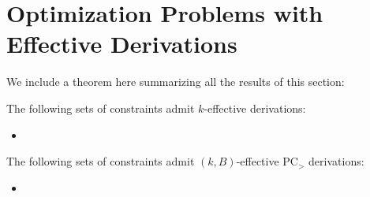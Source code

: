 \section{Optimization Problems with Effective Derivations}
We include a theorem here summarizing all the results of this section:
\begin{corollary}\label{cor:effective_list}
The following sets of constraints admit $k$-effective derivations:
\begin{itemize}
\item
\end{itemize}
The following sets of constraints admit $(k,B)$-effective PC$_>$ derivations:
\begin{itemize}
\item
\end{itemize}
\end{corollary}
